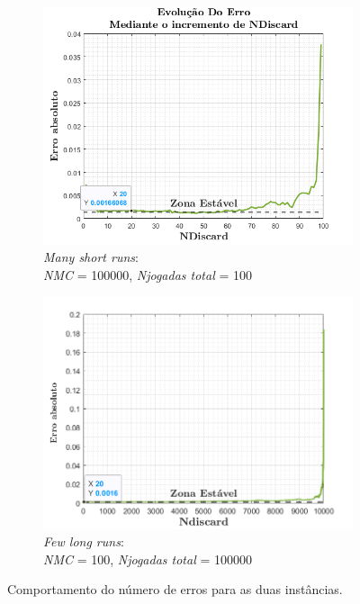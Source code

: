 \begin{figure}[H] 
    \begin{subfigure}[b]{0.5\linewidth}
        \centering
        \includegraphics[width=1\linewidth]{img/P2/P2iiishort.png}
        \caption{\textit{Many short runs}:\\ \textit{NMC} = 100000, \textit{Njogadas total} = 100} 
        \label{fig:short} 
    \end{subfigure}%
    \begin{subfigure}[b]{0.5\linewidth}
        \centering
        \includegraphics[width=1\linewidth]{img/P2/P2iiilong.png} 
        \caption{\textit{Few long runs}:\\ \textit{NMC} = 100, \textit{Njogadas total} = 100000} 
        \label{fig:Long} 
    \end{subfigure} 
    \caption{Comportamento do número de erros para as duas instâncias.}
    \label{fig:COMPARENdiscard}
\end{figure}


